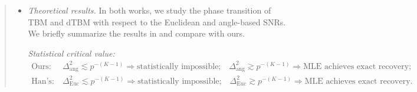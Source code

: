 \documentclass[11pt]{article}
\theoremstyle{definition}
\theoremstyle{definition}
\newtheorem{example}{Example}
\begin{document}
\begin{enumerate}[wide, labelwidth=!, labelindent=0pt]
\begin{quote}
\begin{itemize}[wide]
Here, we provide an example to illustrate the dramatical difference between TBM and dTBM with the same core tensor.  

\begin{example}[Comparison with Euclidean-based signal notion] \label{example:euc_alg} Consider a biclustering model with $\mtheta=1$ and an order-2 core matrix 
\begin{equation}
    \mS = \begin{pmatrix} p^{(\gamma+1)/2 } + 2  & 2 p^{(\gamma+1)/2} + 4\\
    2 & 4
    \end{pmatrix},\quad \text{with}\ \gamma \leq -1.
\end{equation}
The core matrix $\mS$ lies in the parameter spaces of TBM and our dTBM. Here, the constraint $\gamma \leq -1$ is added to ensure the bounded condition of $\mS$ in our parameter space in \eqref{eq:family}. The angle-based and Euclidean-based signal levels of $\mS$ are 
\begin{equation}
    \Delta_{\text{ang }}^2(\mS) = 0 \ \left(\leq p^{\gamma}\right), \quad \Delta_{\text{Euc}}^2(\mS) = 5 p^{\gamma + 1} \ \left(\geq p^{\gamma}\right).
\end{equation}
We conclude that TBM with $\mS$ achieves exact recovery with a polynomial-time algorithm; see \citet[Theorem 4]{han2020exact}. By contrast, the dTBM with the same $\mS$ and input $r=2$ violets the identifiability condition, and thus fails to be solved by all estimators; see our Theorem~\ref{thm:unique}. 
\end{example}
    
    \item \textit{Theoretical results.} In both works, we study the phase transition of TBM and dTBM with respect to the Euclidean and angle-based SNRs. We briefly summarize the results in \cite{han2020exact} and compare with ours. 
    
    \textit{Statistical critical value:}
    \begin{align}
        \text{Ours:}& \ \Delta_{\text{ang}}^2 \lesssim p^{-(K-1)} \Rightarrow \text{statistically impossible;} \quad \Delta_{\text{ang}}^2 \gtrsim   p^{-(K-1)} \Rightarrow \text{MLE achieves exact recovery;} \\
        \text{Han's:}& \ \Delta_{\text{Euc}}^2 \lesssim p^{-(K-1)} \Rightarrow \text{statistically impossible;} \quad \Delta_{\text{Euc}}^2 \gtrsim   p^{-(K-1)} \Rightarrow \text{MLE achieves exact recovery}.
    \end{align}
    

\end{itemize}
\end{quote}
\end{enumerate}
\end{document}
